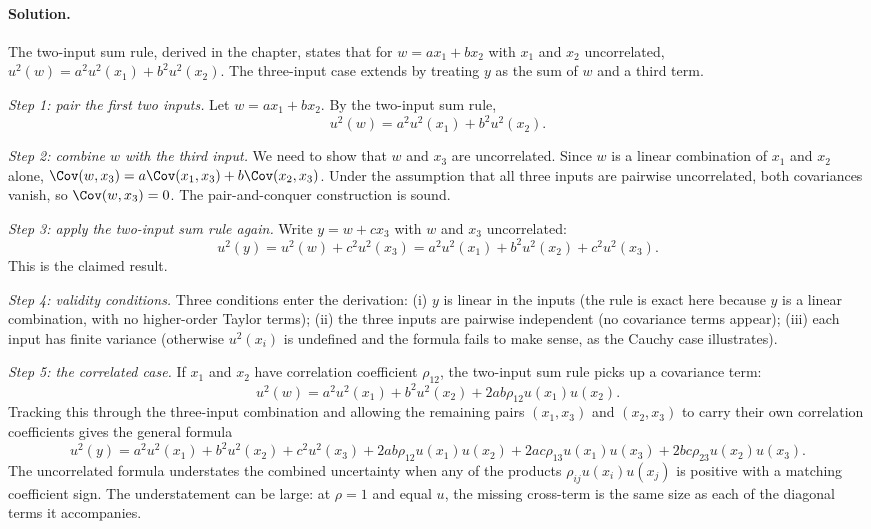 \paragraph{Solution.}
The two-input sum rule, derived in the chapter, states that for
$w = a x_{1} + b x_{2}$ with $x_{1}$ and $x_{2}$ uncorrelated,
$u^{2}(w) = a^{2} u^{2}(x_{1}) + b^{2} u^{2}(x_{2})$. The three-input
case extends by treating $y$ as the sum of $w$ and a third term.

\emph{Step 1: pair the first two inputs.} Let $w = a x_{1} + b x_{2}$.
By the two-input sum rule,
\[
u^{2}(w) = a^{2} u^{2}(x_{1}) + b^{2} u^{2}(x_{2}).
\]

\emph{Step 2: combine $w$ with the third input.} We need to show
that $w$ and $x_{3}$ are uncorrelated. Since $w$ is a linear
combination of $x_{1}$ and $x_{2}$ alone, $\Cov(w, x_{3}) =
a\Cov(x_{1}, x_{3}) + b\Cov(x_{2}, x_{3})$. Under the assumption
that all three inputs are pairwise uncorrelated, both covariances
vanish, so $\Cov(w, x_{3}) = 0$. The pair-and-conquer construction
is sound.

\emph{Step 3: apply the two-input sum rule again.} Write
$y = w + c x_{3}$ with $w$ and $x_{3}$ uncorrelated:
\[
u^{2}(y) = u^{2}(w) + c^{2} u^{2}(x_{3})
= a^{2} u^{2}(x_{1}) + b^{2} u^{2}(x_{2}) + c^{2} u^{2}(x_{3}).
\]
This is the claimed result.

\emph{Step 4: validity conditions.} Three conditions enter the
derivation: (i) $y$ is linear in the inputs (the rule is exact here
because $y$ is a linear combination, with no higher-order Taylor
terms); (ii) the three inputs are pairwise independent (no
covariance terms appear); (iii) each input has finite variance
(otherwise $u^{2}(x_{i})$ is undefined and the formula fails to
make sense, as the Cauchy case illustrates).

\emph{Step 5: the correlated case.} If $x_{1}$ and $x_{2}$ have
correlation coefficient $\rho_{12}$, the two-input sum rule picks
up a covariance term:
\[
u^{2}(w) = a^{2} u^{2}(x_{1}) + b^{2} u^{2}(x_{2}) + 2ab\rho_{12}
u(x_{1}) u(x_{2}).
\]
Tracking this through the three-input combination and allowing the
remaining pairs $(x_{1}, x_{3})$ and $(x_{2}, x_{3})$ to carry
their own correlation coefficients gives the general formula
\[
u^{2}(y) = a^{2} u^{2}(x_{1}) + b^{2} u^{2}(x_{2}) + c^{2}
u^{2}(x_{3}) + 2ab\rho_{12}u(x_{1})u(x_{2}) + 2ac\rho_{13}u(x_{1})
u(x_{3}) + 2bc\rho_{23}u(x_{2})u(x_{3}).
\]
The uncorrelated formula understates the combined uncertainty when
any of the products $\rho_{ij}u(x_{i})u(x_{j})$ is positive with a
matching coefficient sign. The understatement can be large: at
$\rho = 1$ and equal $u$, the missing cross-term is the same size
as each of the diagonal terms it accompanies.

